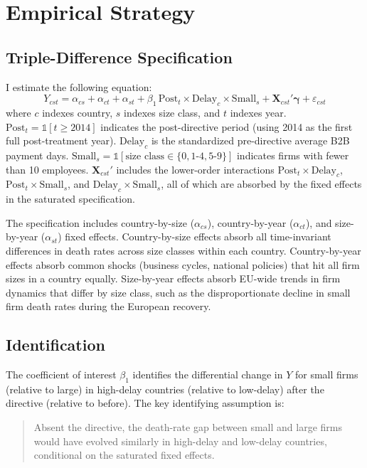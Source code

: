 \documentclass[12pt]{article}
\begin{document}



\section{Empirical Strategy}
\label{sec:strategy}

\subsection{Triple-Difference Specification}

I estimate the following equation:
\begin{equation}
Y_{cst} = \alpha_{cs} + \alpha_{ct} + \alpha_{st} + \beta_1 \, \text{Post}_t \times \text{Delay}_c \times \text{Small}_s + \mathbf{X}_{cst}'\boldsymbol{\gamma} + \varepsilon_{cst}
\label{eq:main}
\end{equation}
where $c$ indexes country, $s$ indexes size class, and $t$ indexes year. $\text{Post}_t = \mathbb{1}[t \geq 2014]$ indicates the post-directive period (using 2014 as the first full post-treatment year). $\text{Delay}_c$ is the standardized pre-directive average B2B payment days. $\text{Small}_s = \mathbb{1}[\text{size class} \in \{0, 1\text{-}4, 5\text{-}9\}]$ indicates firms with fewer than 10 employees. $\mathbf{X}_{cst}'$ includes the lower-order interactions $\text{Post}_t \times \text{Delay}_c$, $\text{Post}_t \times \text{Small}_s$, and $\text{Delay}_c \times \text{Small}_s$, all of which are absorbed by the fixed effects in the saturated specification.

The specification includes country-by-size ($\alpha_{cs}$), country-by-year ($\alpha_{ct}$), and size-by-year ($\alpha_{st}$) fixed effects. Country-by-size effects absorb all time-invariant differences in death rates across size classes within each country. Country-by-year effects absorb common shocks (business cycles, national policies) that hit all firm sizes in a country equally. Size-by-year effects absorb EU-wide trends in firm dynamics that differ by size class, such as the disproportionate decline in small firm death rates during the European recovery.

\subsection{Identification}

The coefficient of interest $\beta_1$ identifies the differential change in $Y$ for small firms (relative to large) in high-delay countries (relative to low-delay) after the directive (relative to before). The key identifying assumption is:
\begin{quote}
Absent the directive, the death-rate gap between small and large firms would have evolved similarly in high-delay and low-delay countries, conditional on the saturated fixed effects.
\end{quote}
\end{document}
